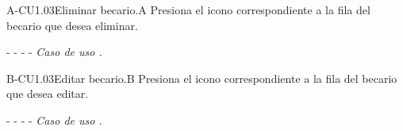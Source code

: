 \begin{UCtrayectoriaA}{A-CU1.03}{Eliminar becario.}{A}
	     \UCpaso[\UCactor]Presiona el icono  \faTrashO  correspondiente a la fila del becario que desea eliminar.
	     
	    \item[- -] - - {\em Caso de uso .}
	\end{UCtrayectoriaA}

\begin{UCtrayectoriaA}{B-CU1.03}{Editar becario.}{B}
	     \UCpaso[\UCactor]Presiona el icono  \faEdit correspondiente a la fila del becario que desea editar.
	     
	    \item[- -] - - {\em Caso de uso .}
	\end{UCtrayectoriaA}



	
		
